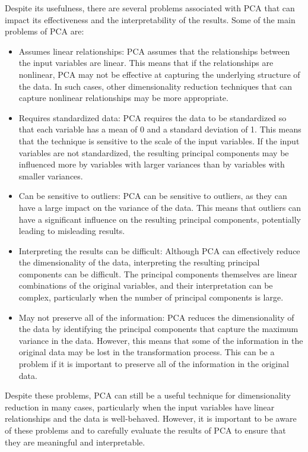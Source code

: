 \documentclass[12pt, a4paper]{article}
\begin{document}
Despite its usefulness, there are several problems associated with PCA that can impact its effectiveness and the interpretability of the results. Some of the main problems of PCA are:

\begin{itemize}
    \item 
Assumes linear relationships: PCA assumes that the relationships between the input variables are linear. This means that if the relationships are nonlinear, PCA may not be effective at capturing the underlying structure of the data. In such cases, other dimensionality reduction techniques that can capture nonlinear relationships may be more appropriate.

    \item 
Requires standardized data: PCA requires the data to be standardized so that each variable has a mean of 0 and a standard deviation of 1. This means that the technique is sensitive to the scale of the input variables. If the input variables are not standardized, the resulting principal components may be influenced more by variables with larger variances than by variables with smaller variances.

    \item 
Can be sensitive to outliers: PCA can be sensitive to outliers, as they can have a large impact on the variance of the data. This means that outliers can have a significant influence on the resulting principal components, potentially leading to misleading results.

    \item 
Interpreting the results can be difficult: Although PCA can effectively reduce the dimensionality of the data, interpreting the resulting principal components can be difficult. The principal components themselves are linear combinations of the original variables, and their interpretation can be complex, particularly when the number of principal components is large.
    \item 
May not preserve all of the information: PCA reduces the dimensionality of the data by identifying the principal components that capture the maximum variance in the data. However, this means that some of the information in the original data may be lost in the transformation process. This can be a problem if it is important to preserve all of the information in the original data.
\end{itemize}

Despite these problems, PCA can still be a useful technique for dimensionality reduction in many cases, particularly when the input variables have linear relationships and the data is well-behaved. However, it is important to be aware of these problems and to carefully evaluate the results of PCA to ensure that they are meaningful and interpretable.
\end{document}
